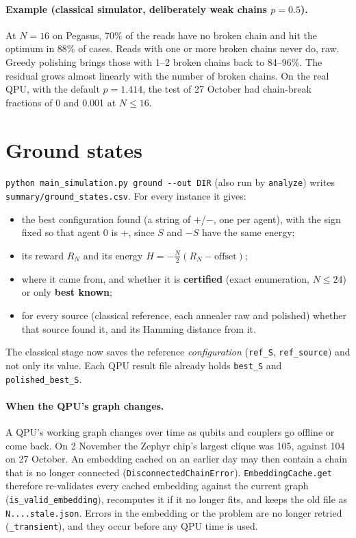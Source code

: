 \documentclass[11pt,a4paper]{article}
\newcommand{\code}[1]{\nolinkurl{#1}}
\newcommand{\src}[4]{}
\begin{document}
\paragraph{Example (classical simulator, deliberately weak chains $p=0.5$).} At $N=16$ on Pegasus, 70\% of the reads have no broken chain and hit the optimum in 88\% of cases. Reads with one or more broken chains never do, raw. Greedy polishing brings those with 1--2 broken chains back to 84--96\%. The residual grows almost linearly with the number of broken chains. On the real QPU, with the default $p=1.414$, the test of 27 October had chain-break fractions of 0 and 0.001 at $N\le16$.

\section{Ground states}
\code{python main_simulation.py ground --out DIR} (also run by \code{analyze}) writes \code{summary/ground_states.csv}. For every instance it gives:
\begin{itemize}
\item the best configuration found (a string of $+$/$-$, one per agent), with the sign fixed so that agent 0 is $+$, since $S$ and $-S$ have the same energy;
\item its reward $R_N$ and its energy $H=-\tfrac{N}{2}(R_N-\text{offset})$;
\item where it came from, and whether it is \textbf{certified} (exact enumeration, $N\le24$) or only \textbf{best known};
\item for every source (classical reference, each annealer raw and polished) whether that source found it, and its Hamming distance from it.
\end{itemize}
The classical stage now saves the reference \emph{configuration} (\code{ref_S}, \code{ref_source}) and not only its value. Each QPU result file already holds \code{best_S} and \code{polished_best_S}.
\src{main_simulation.py}{\rGroundA}{\rGroundB}{the ground-state report}

\paragraph{When the QPU's graph changes.} A QPU's working graph changes over time as qubits and couplers go offline or come back. On 2 November the Zephyr chip's largest clique was 105, against 104 on 27 October. An embedding cached on an earlier day may then contain a chain that is no longer connected (\code{DisconnectedChainError}). \code{EmbeddingCache.get} therefore re-validates every cached embedding against the current graph (\code{is_valid_embedding}), recomputes it if it no longer fits, and keeps the old file as \code{N....stale.json}. Errors in the embedding or the problem are no longer retried (\code{_transient}), and they occur before any QPU time is used.
\end{document}
